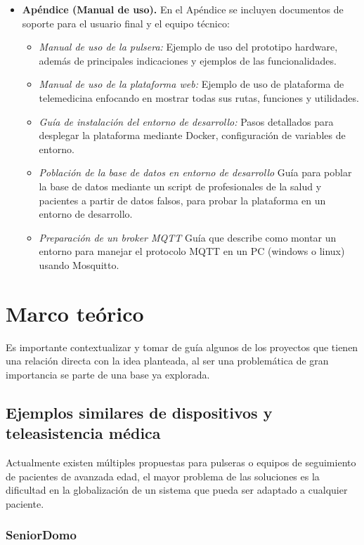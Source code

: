 \documentclass[12pt, a4paper]{article}
\begin{document}
\begin{itemize}
		\item \textbf{Apéndice (Manual de uso).}  
		En el Apéndice se incluyen documentos de soporte para el usuario final y el equipo técnico:
		\begin{itemize}
			\item \emph{Manual de uso de la pulsera:} Ejemplo de uso del prototipo hardware, además de principales indicaciones y ejemplos de las funcionalidades.  
			\item \emph{Manual de uso de la plataforma web:} Ejemplo de uso de plataforma de telemedicina enfocando en mostrar todas sus rutas,  funciones y utilidades. 
			\item \emph{Guía de instalación del entorno de desarrollo:} Pasos detallados para desplegar la plataforma mediante Docker, configuración de variables de entorno.
			\item \emph{Población de la base de datos en entorno de desarrollo} Guía para poblar la base de datos mediante un script de profesionales de la salud y pacientes a partir de datos falsos, para probar la plataforma en un entorno de desarrollo.
			\item \emph{Preparación de un broker MQTT} Guía que describe como montar un entorno para manejar el protocolo MQTT en un PC (windows o linux) usando Mosquitto.
		\end{itemize}
	\end{itemize}
	

\section{Marco teórico}

	Es importante contextualizar y tomar de guía algunos de los proyectos que tienen una relación directa con la idea planteada, al ser una problemática de gran importancia se parte de una base ya explorada.

	\subsection{Ejemplos similares de dispositivos y teleasistencia médica}
	
	Actualmente existen múltiples propuestas para pulseras o equipos de seguimiento de pacientes de avanzada edad, el mayor problema de las soluciones es la dificultad en la globalización de un sistema que pueda ser adaptado a cualquier paciente.
	
	\subsubsection{SeniorDomo}
	
\end{document}

